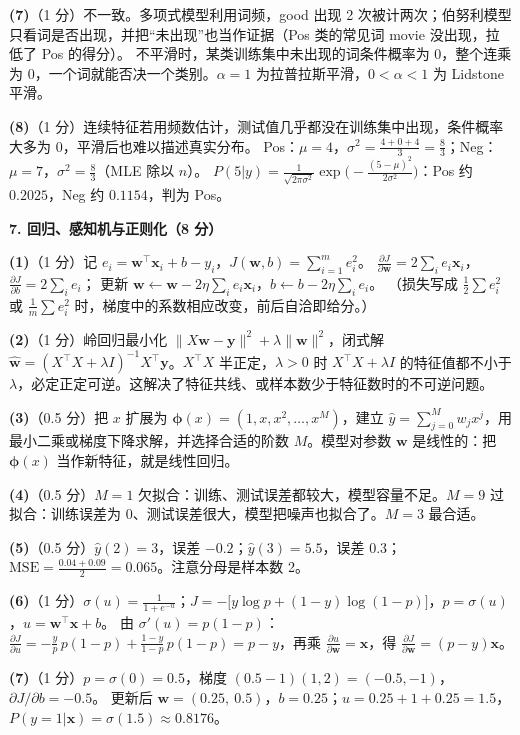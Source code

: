 \textbf{(7)}（1 分）不一致。多项式模型利用词频，good 出现 2 次被计两次；伯努利模型只看词是否出现，并把“未出现”也当作证据（Pos 类的常见词 movie 没出现，拉低了 Pos 的得分）。
不平滑时，某类训练集中未出现的词条件概率为 0，整个连乘为 0，一个词就能否决一个类别。$\alpha=1$ 为拉普拉斯平滑，$0<\alpha<1$ 为 Lidstone 平滑。

\textbf{(8)}（1 分）连续特征若用频数估计，测试值几乎都没在训练集中出现，条件概率大多为 0，平滑后也难以描述真实分布。
Pos：$\mu=4$，$\sigma^2=\frac{4+0+4}{3}=\frac83$；Neg：$\mu=7$，$\sigma^2=\frac83$（MLE 除以 $n$）。
$P(5|y)=\frac1{\sqrt{2\pi\sigma^2}}\exp\!\big(-\frac{(5-\mu)^2}{2\sigma^2}\big)$：Pos 约 $0.2025$，Neg 约 $0.1154$，判为 Pos。

\medskip
\noindent\textbf{7. 回归、感知机与正则化（8 分）}

\textbf{(1)}（1 分）记 $e_i=\bm w^\top\bm x_i+b-y_i$，$J(\bm w,b)=\sum_{i=1}^m e_i^2$。
$\frac{\partial J}{\partial\bm w}=2\sum_ie_i\bm x_i$，$\frac{\partial J}{\partial b}=2\sum_ie_i$；
更新 $\bm w\leftarrow\bm w-2\eta\sum_ie_i\bm x_i$，$b\leftarrow b-2\eta\sum_ie_i$。
（损失写成 $\frac12\sum e_i^2$ 或 $\frac1m\sum e_i^2$ 时，梯度中的系数相应改变，前后自洽即给分。）

\textbf{(2)}（1 分）岭回归最小化 $\|X\bm w-\bm y\|^2+\lambda\|\bm w\|^2$，闭式解 $\hat{\bm w}=(X^\top X+\lambda I)^{-1}X^\top\bm y$。$X^\top X$ 半正定，$\lambda>0$ 时 $X^\top X+\lambda I$ 的特征值都不小于 $\lambda$，必定正定可逆。这解决了特征共线、或样本数少于特征数时的不可逆问题。

\textbf{(3)}（0.5 分）把 $x$ 扩展为 $\bm\phi(x)=(1,x,x^2,\dots,x^M)$，建立 $\hat y=\sum_{j=0}^Mw_jx^j$，用最小二乘或梯度下降求解，并选择合适的阶数 $M$。模型对参数 $\bm w$ 是线性的：把 $\bm\phi(x)$ 当作新特征，就是线性回归。

\textbf{(4)}（0.5 分）$M=1$ 欠拟合：训练、测试误差都较大，模型容量不足。$M=9$ 过拟合：训练误差为 0、测试误差很大，模型把噪声也拟合了。$M=3$ 最合适。

\textbf{(5)}（0.5 分）$\hat y(2)=3$，误差 $-0.2$；$\hat y(3)=5.5$，误差 $0.3$；$\mathrm{MSE}=\frac{0.04+0.09}{2}=0.065$。注意分母是样本数 2。

\textbf{(6)}（1 分）$\sigma(u)=\frac1{1+e^{-u}}$；$J=-\big[y\log p+(1-y)\log(1-p)\big]$，$p=\sigma(u)$，$u=\bm w^\top\bm x+b$。
由 $\sigma'(u)=p(1-p)$：$\frac{\partial J}{\partial u}=-\frac yp\,p(1-p)+\frac{1-y}{1-p}\,p(1-p)=p-y$，再乘 $\frac{\partial u}{\partial\bm w}=\bm x$，得 $\frac{\partial J}{\partial\bm w}=(p-y)\bm x$。

\textbf{(7)}（1 分）$p=\sigma(0)=0.5$，梯度 $(0.5-1)(1,2)=(-0.5,-1)$，$\partial J/\partial b=-0.5$。
更新后 $\bm w=(0.25,\ 0.5)$，$b=0.25$；$u=0.25+1+0.25=1.5$，$P(y=1|\bm x)=\sigma(1.5)\approx0.8176$。

